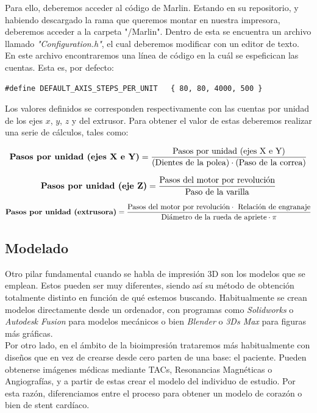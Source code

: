 \documentclass[a4paper,12pt]{article}
\begin{document}
Para ello, deberemos acceder al código de Marlin. Estando en su repositorio, y habiendo descargado la rama que queremos montar en nuestra impresora, deberemos acceder a la carpeta "/Marlin". Dentro de esta se encuentra un archivo llamado \emph{"Configuration.h"}, el cual deberemos modificar con un editor de texto.\\

En este archivo encontraremos una línea de código en la cuál se espeficican las cuentas. Esta es, por defecto:
\begin{lstlisting}
#define DEFAULT_AXIS_STEPS_PER_UNIT   { 80, 80, 4000, 500 }
\end{lstlisting}

Los valores definidos se corresponden respectivamente con las cuentas por unidad de los ejes $x$, $y$, $z$ y del extrusor. Para obtener el valor de estas deberemos realizar una serie de cálculos, tales como:

$$ \text{\textbf{Pasos por unidad (ejes X e Y)}} = \frac{\text{Pasos por unidad  (ejes X e Y)}}{\text{(Dientes de la polea)}\cdot \text{(Paso de la correa)}}$$
	
$$ \text{\textbf{Pasos por unidad (eje Z)}} = \frac{\text{Pasos del motor por revolución}}{\text{Paso de la varilla}}$$
	
$$ \text{\textbf{Pasos por unidad (extrusora)}} = \frac{\text{Pasos del motor por revolución} \cdot \text{ Relación de engranaje}}{\text{Diámetro de la rueda de apriete}\cdot \pi}$$



\FloatBarrier
\subsection{Modelado}
Otro pilar fundamental cuando se habla de impresión 3D son los modelos que se emplean. Estos pueden ser muy diferentes, siendo así su método de obtención totalmente distinto en función de qué estemos buscando. Habitualmente se crean modelos directamente desde un ordenador, con programas como \emph{Solidworks} o \emph{Autodesk Fusion} para modelos mecánicos o bien \emph{Blender} o \emph{3Ds Max} para figuras más gráficas.\\

Por otro lado, en el ámbito de la bioimpresión trataremos más habitualmente con diseños que en vez de crearse desde cero parten de una base: el paciente. Pueden obtenerse imágenes médicas mediante TACs, Resonancias Magnéticas o Angiografías, y a partir de estas crear el modelo del individuo de estudio. Por esta razón, diferenciamos entre el proceso para obtener un modelo de corazón o bien de stent cardíaco.\\
\end{document}
